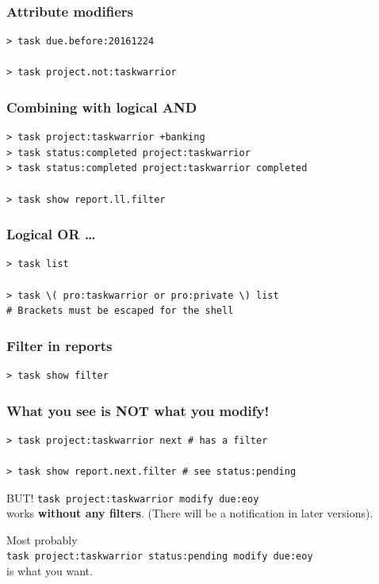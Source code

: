 \documentclass[t,handout,aspectratio=169]{beamer}
\begin{document}
\begin{frame}[fragile]\frametitle{Attribute modifiers}
    \vfill
    \begin{lstlisting}
> task due.before:20161224

> task project.not:taskwarrior\end{lstlisting}
\end{frame}

\begin{frame}[fragile]\frametitle{Combining with logical AND}
    \vfill
    \begin{lstlisting}
> task project:taskwarrior +banking
> task status:completed project:taskwarrior
> task status:completed project:taskwarrior completed

> task show report.ll.filter\end{lstlisting}
\end{frame}

\begin{frame}[fragile]\frametitle{Logical OR \ldots}
    \vfill
    \begin{lstlisting}
> task list

> task \( pro:taskwarrior or pro:private \) list
# Brackets must be escaped for the shell\end{lstlisting}
\end{frame}

\begin{frame}[fragile]\frametitle{Filter in reports}
    \vfill
    \begin{lstlisting}
> task show filter\end{lstlisting}
\end{frame}

\begin{frame}[fragile]\frametitle{What you see is NOT what you modify!}
    \vfill
    \begin{lstlisting}
> task project:taskwarrior next # has a filter

> task show report.next.filter # see status:pending\end{lstlisting} \pause

    \begin{alertblock}{BUT!}
        \verb+task project:taskwarrior modify due:eoy+ \\
        works \textbf{without any filters}. (There will be a notification in later versions).

        Most probably \\
        \verb+task project:taskwarrior status:pending modify due:eoy+ \\
        is what you want.
    \end{alertblock}
\end{frame}
\end{document}
